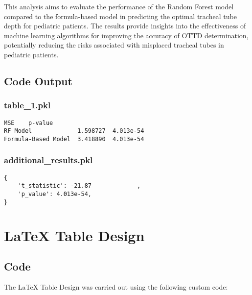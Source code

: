 \documentclass[11pt]{article}
\begin{document}
This analysis aims to evaluate the performance of the Random Forest model compared to the formula-based model in predicting the optimal tracheal tube depth for pediatric patients. The results provide insights into the effectiveness of machine learning algorithms for improving the accuracy of OTTD determination, potentially reducing the risks associated with misplaced tracheal tubes in pediatric patients.

\subsection{Code Output}

\subsubsection*{table\_1.pkl}

\begin{Verbatim}[tabsize=4]
                          MSE    p-value
RF Model             1.598727  4.013e-54
Formula-Based Model  3.418890  4.013e-54
\end{Verbatim}

\subsubsection*{additional\_results.pkl}

\begin{Verbatim}[tabsize=4]
{
    't_statistic': -21.87             ,
    'p_value': 4.013e-54,
}
\end{Verbatim}

\section{LaTeX Table Design}
\subsection{{Code}}
The LaTeX Table Design was carried out using the following custom code:
\end{document}
